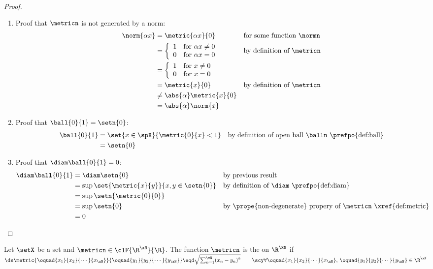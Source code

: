 \begin{proof}
\begin{enumerate}
  \item Proof that $\metricn$ is not generated by a norm:
    \begin{align*}
      \norm{\alpha x}
        &= \metric{\alpha x}{0}
        && \text{for some function $\normn$}
      \\&= \left\{\begin{array}{ll}1 &\text{for } \alpha x\ne 0 \\0&\text{for }\alpha x=0 \end{array} \right.
        && \text{by definition of $\metricn$}
      \\&= \left\{\begin{array}{ll}1 &\text{for } x\ne 0 \\0&\text{for } x=0 \end{array} \right.
      \\&= \metric{x}{0}
        && \text{by definition of $\metricn$}
      \\&\ne  \abs{\alpha}\metric{x}{0}
      \\&= \abs{\alpha}\norm{x}
    \end{align*}

  \item Proof that $\ball{0}{1}=\setn{0}$:
    \begin{align*}
      \ball{0}{1}
        &= \set{x\in\spX}{\metric{0}{x}<1}
        && \text{by definition of open ball $\balln$ \prefpo{def:ball}}
      \\&= \setn{0}
    \end{align*}

  \item Proof that $\diam\ball{0}{1}=0$:
    \begin{align*}
      \diam\ball{0}{1}
        &= \diam\setn{0}
        && \text{by previous result}
      \\&= \sup\set{\metric{x}{y}}{x,y\in\setn{0}}
        && \text{by definition of $\diam$ \prefpo{def:diam}}
      \\&= \sup\setn{\metric{0}{0}}
      \\&= \sup\setn{0}
        && \text{by \prope{non-degenerate} propery of $\metricn$ \xref{def:metric}}
      \\&= 0
    \end{align*}

  \end{enumerate}
\end{proof}

\begin{definition}
\label{def:emetric}
Let $\setX$ be a set and $\metricn\in\clF{\R^\xN}{\R}$.
The function $\metricn$ is the  on $\R^\xN$ if
\\\indentx$\ds
  \metric{\oquad{x_1}{x_2}{\cdots}{x_\xN}}{\oquad{y_1}{y_2}{\cdots}{y_\xN}}
    \eqd \sqrt{\sum_{n=1}^\xN (x_n-y_n)^2}
  \qquad\scy
  \forall\oquad{x_1}{x_2}{\cdots}{x_\xN},\,\oquad{y_1}{y_2}{\cdots}{y_\xN}\in\R^\xN
  $
\end{definition}

